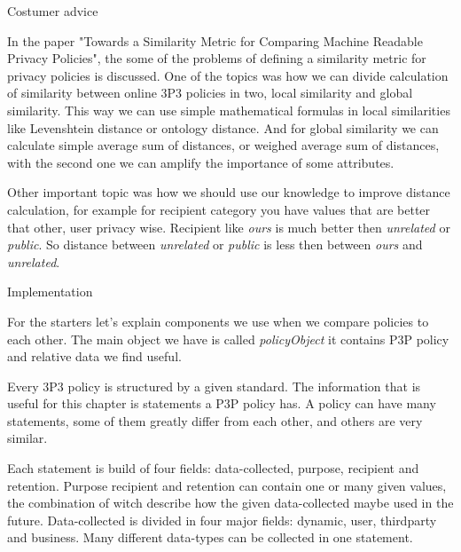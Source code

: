 \documentclass{article}
\begin{document}
\noindent 

\noindent Costumer advice

\noindent In the paper "Towards a Similarity Metric for Comparing Machine Readable Privacy Policies", the some of the problems of defining a similarity metric for privacy policies is discussed. One of the topics was how we can divide calculation of similarity between online 3P3 policies in two, local similarity and global similarity. This way we can use simple mathematical formulas in local similarities like Levenshtein distance or ontology distance. And for global similarity we can calculate simple average sum of distances, or weighed average sum of distances, with the second one we can amplify the importance of some attributes.

\noindent 

\noindent Other important topic was how we should use our knowledge to improve distance calculation, for example for recipient category you have values that are better that other, user privacy wise. Recipient like \textit{ours} is much better then \textit{unrelated} or \textit{public}. So distance between \textit{unrelated} or \textit{public} is less then between \textit{ours} and \textit{unrelated}.

\noindent 

\noindent Implementation

\noindent 

\noindent For the starters let's explain components we use when we compare policies to each other. The main object we have is called \textit{policyObject} it contains P3P policy and relative data we find useful.

\noindent 

\noindent Every 3P3 policy is structured by a given standard. The information that is useful for this chapter is statements a P3P policy has. A policy can have many statements, some of them greatly differ from each other, and others are very similar. 

\noindent 

\noindent Each statement is build of four fields: data-collected, purpose, recipient and retention. Purpose recipient and retention can contain one or many given values, the combination of witch describe how the given data-collected maybe used in the future. Data-collected is divided in four major fields: dynamic, user, thirdparty and business. Many different data-types can be collected in one statement.

\noindent 
\end{document}
